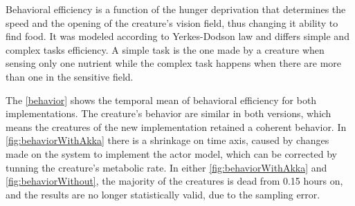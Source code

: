 \documentclass[runningheads]{llncs}
\begin{document}
Behavioral efficiency is a function of the hunger deprivation that determines the speed and the opening of the creature's vision field, thus changing it ability to find food. It was modeled according to Yerkes-Dodson law \cite{Yerkes1908} and differs simple and complex tasks efficiency. A simple task is the one made by a creature when sensing only one nutrient while the complex task happens when there are more than one in the sensitive field. 

The \autoref{behavior} shows the temporal mean of behavioral efficiency for both implementations. The creature's behavior are similar in both versions, which means the creatures of the new implementation retained a coherent behavior. In \autoref{fig:behaviorWithAkka} there is a shrinkage on time axis, caused by changes made on the system to implement the actor model, which can be corrected by tunning the creature's metabolic rate. In either \autoref{fig:behaviorWithAkka} and \autoref{fig:behaviorWithout}, the majority of the creatures is dead from 0.15 hours on, and the results are no longer statistically valid, due to the sampling error.
 \newpage
\end{document}
